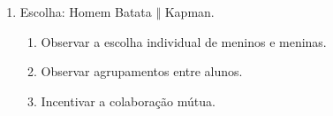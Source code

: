 \begin{enumerate}
	\item Escolha: Homem Batata \textbf{$\Vert$} Kapman.
	\begin{enumerate}
		\item Observar a escolha individual de meninos e meninas.
		\item Observar agrupamentos entre alunos.
		\item Incentivar a colaboração mútua.
	\end{enumerate}
\end{enumerate}